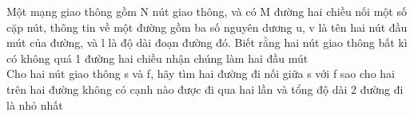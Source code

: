 Một mạng giao thông gồm N nút giao thông, và có M đường hai chiều nối một số cặp nút, thông tin về một đường gồm ba số nguyên dương u, v là tên hai nút đầu mút của đường, và l là độ dài đoạn đường đó. Biết rằng hai nút giao thông bất kì có không quá 1 đường hai chiều nhận chúng làm hai đầu mút   
\\   Cho hai nút giao thông s và f, hãy tìm hai đường đi nối giữa s với f sao cho hai trên hai đường không có cạnh nào được đi qua hai lần và tổng độ dài 2 đường đi là nhỏ nhất  



\
